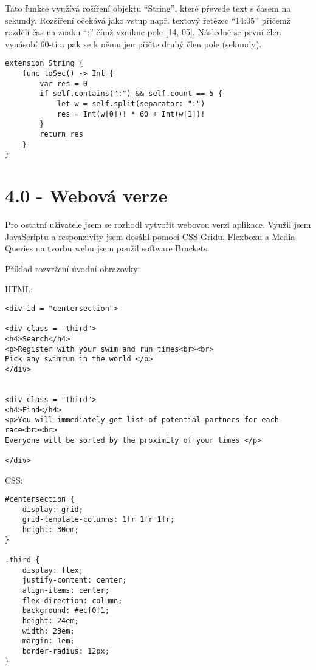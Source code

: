 \documentclass{article}
\begin{document}
\vspace{10 mm}
Tato funkce využívá rošíření objektu “String”, které převede text s časem na sekundy. Rozšíření očekává jako vstup např. textový řetězec “14:05” přičemž rozdělí čas na znaku “:” čímž vznikne pole [14, 05]. Následně se první člen vynásobí 60-ti a pak se k němu jen přičte druhý člen pole (sekundy).

\vspace{10 mm}

\begin{verbatim}
extension String {
    func toSec() -> Int {
        var res = 0
        if self.contains(":") && self.count == 5 {
            let w = self.split(separator: ":")
            res = Int(w[0])! * 60 + Int(w[1])!
        }
        return res
    }
}

\end{verbatim}



\vspace{10 mm}
\section{4.0 - Webová verze}

Pro ostatní uživatele jsem se rozhodl vytvořit webovou verzi aplikace. Využil jsem JavaScriptu a responzivity jsem dosáhl pomocí CSS Gridu, Flexboxu a Media Queries na tvorbu webu jsem použil software Brackets. 

Příklad rozvržení úvodní obrazovky:


HTML:
\begin{verbatim}
<div id = "centersection">
    
<div class = "third">
<h4>Search</h4>
<p>Register with your swim and run times<br><br>
Pick any swimrun in the world </p>
</div>
    

<div class = "third">
<h4>Find</h4>
<p>You will immediately get list of potential partners for each race<br><br>
Everyone will be sorted by the proximity of your times </p>    

</div>
\end{verbatim}

\vspace{10 mm}
CSS: 

\begin{verbatim}
#centersection {
	display: grid;
	grid-template-columns: 1fr 1fr 1fr;
	height: 30em;
}

.third {
	display: flex;
	justify-content: center;
	align-items: center;
	flex-direction: column;
	background: #ecf0f1;
	height: 24em;
	width: 23em;
	margin: 1em;
	border-radius: 12px;
}
\end{verbatim}
\end{document}
